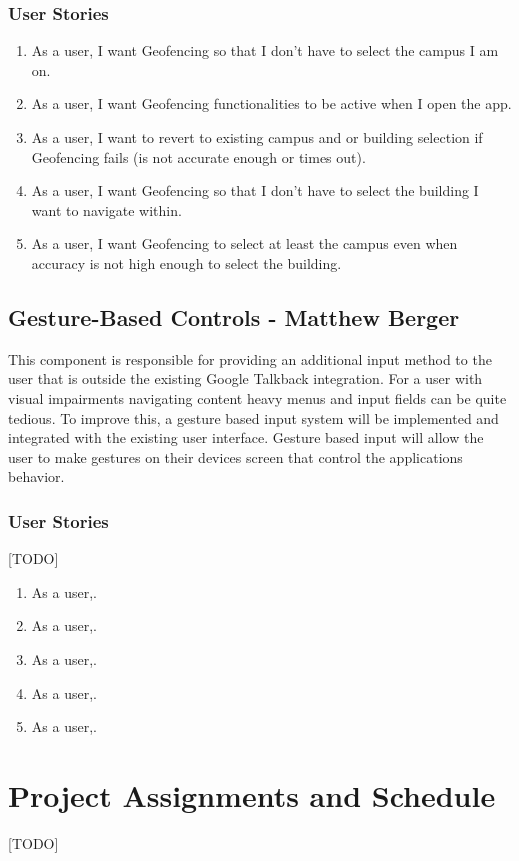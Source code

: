 \documentclass{scrreprt}
\begin{document}
\subsection{User Stories}
\begin{enumerate}
	\item As a user, I want Geofencing so that I don't have to select the campus I am on.
	\item As a user, I want Geofencing functionalities to be active when I open the app.
	\item As a user, I want to revert to existing campus and or building selection if Geofencing fails (is not accurate enough or times out).
	\item As a user, I want Geofencing so that I don't have to select the building I want to navigate within.
	\item As a user, I want Geofencing to select at least the campus even when accuracy is not high enough to select the building.
\end{enumerate}

\section{Gesture-Based Controls - Matthew Berger}
This component is responsible for providing an additional input method to the user that is outside the existing Google Talkback integration. For a user with visual impairments navigating content heavy menus and input fields can be quite tedious. To improve this, a gesture based input system will be implemented and integrated with the existing user interface. Gesture based input will allow the user to make gestures on their devices screen that control the applications behavior.

\subsection{User Stories} [TODO]
\begin{enumerate}
	\item As a user,.
	\item As a user,.
	\item As a user,.
	\item As a user,.
	\item As a user,.
\end{enumerate}

\chapter{Project Assignments and Schedule}
[TODO]
\end{document}
